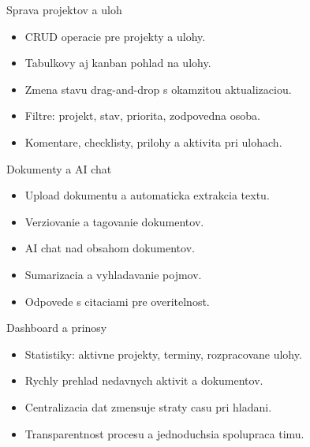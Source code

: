 \documentclass[aspectratio=169]{beamer}
\begin{document}
\begin{frame}{Sprava projektov a uloh}
  \begin{itemize}
    \item CRUD operacie pre projekty a ulohy.
    \item Tabulkovy aj kanban pohlad na ulohy.
    \item Zmena stavu drag-and-drop s okamzitou aktualizaciou.
    \item Filtre: projekt, stav, priorita, zodpovedna osoba.
    \item Komentare, checklisty, prilohy a aktivita pri ulohach.
  \end{itemize}
\end{frame}

\begin{frame}{Dokumenty a AI chat}
  \begin{itemize}
    \item Upload dokumentu a automaticka extrakcia textu.
    \item Verziovanie a tagovanie dokumentov.
    \item AI chat nad obsahom dokumentov.
    \item Sumarizacia a vyhladavanie pojmov.
    \item Odpovede s citaciami pre overitelnost.
  \end{itemize}
\end{frame}

\begin{frame}{Dashboard a prinosy}
  \begin{itemize}
    \item Statistiky: aktivne projekty, terminy, rozpracovane ulohy.
    \item Rychly prehlad nedavnych aktivit a dokumentov.
    \item Centralizacia dat zmensuje straty casu pri hladani.
    \item Transparentnost procesu a jednoduchsia spolupraca timu.
  \end{itemize}
\end{frame}
\end{document}
